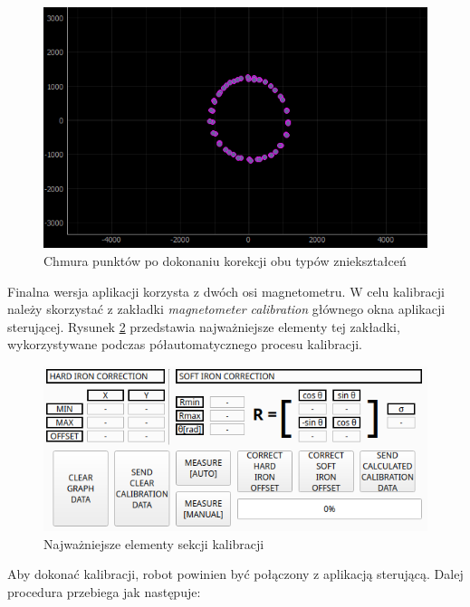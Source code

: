 \begin{figure}[ht]
	\centering
		\includegraphics[width=0.8\linewidth]{rys/ScanBot-11-2d-set-theta-then-sigma-and-done.PNG}
	\caption{Chmura punktów po dokonaniu korekcji obu typów zniekształceń}
	\label{fig:2d-mag-soft-corr-applied}
\end{figure}

Finalna wersja aplikacji korzysta z dwóch osi magnetometru. W celu kalibracji należy skorzystać z zakładki \emph{magnetometer calibration} głównego okna aplikacji sterującej. Rysunek \ref{fig:main-app-mag-section-bottom} przedstawia najważniejsze elementy tej zakładki, wykorzystywane podczas półautomatycznego procesu kalibracji.

\begin{figure}[ht]
	\centering
		\includegraphics[width=1\linewidth]{rys/main-app-view-magnetom-bottom.png}
	\caption{Najważniejsze elementy sekcji kalibracji}
	\label{fig:main-app-mag-section-bottom}
\end{figure}

Aby dokonać kalibracji, robot powinien być połączony z aplikacją sterującą. Dalej procedura przebiega jak następuje:


